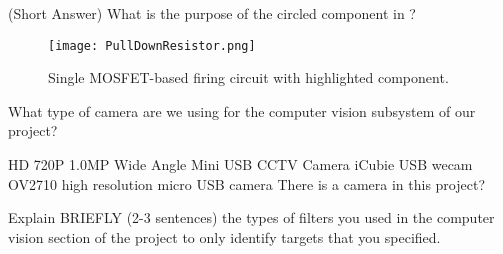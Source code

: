 \documentclass{exam}
\begin{document}
\begin{questions}
\question
(Short Answer) What is the purpose of the circled component in ?
\begin{figure}[h]
\centering
	\texttt{[image: PullDownResistor.png]}
	\caption{Single MOSFET-based firing circuit with highlighted component.}
	\label{fig:PullDownResistor}
\end{figure}





\clearpage
\question
What type of camera are we using for the computer vision subsystem of our project?
\begin{choices}
\choice HD 720P 1.0MP Wide Angle Mini USB CCTV Camera
\choice iCubie USB wecam
\choice OV2710 high resolution micro USB camera
\choice There is a camera in this project?
\end{choices}








\question
Explain BRIEFLY (2-3 sentences) the types of filters you used in the computer vision section of the project to only identify targets that you specified.
\end{questions}
\end{document}
